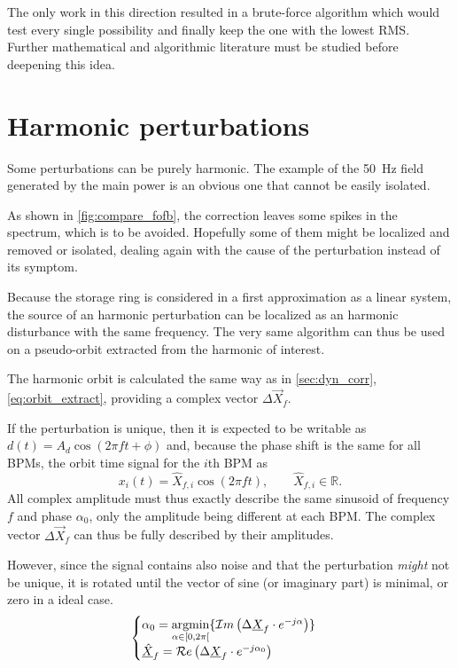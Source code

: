 The only work in this direction resulted in a brute-force algorithm which would test every single possibility and finally keep the one with the lowest RMS. Further mathematical and algorithmic literature must be studied before deepening this idea.

\section{Harmonic perturbations}
\label{sec:loc_dyn}
Some perturbations can be purely harmonic. The example of the \SI{50}{\hertz} field generated by the main power is an obvious one that cannot be easily isolated. 

As shown in \cref{fig:compare_fofb}, the correction leaves some spikes in the spectrum, which is to be avoided. Hopefully some of them might be localized and removed or isolated, dealing again with the cause of the perturbation instead of its symptom.

Because the storage ring is considered in a first approximation as a linear system, the source of an harmonic perturbation can be localized as an harmonic disturbance with the same frequency. The very same algorithm can thus be used on a pseudo-orbit extracted from the harmonic of interest. 

The harmonic orbit is calculated the same way as in \cref{sec:dyn_corr}, \cref{eq:orbit_extract}, providing a complex vector $\Delta\vec{X}_f$.

If the perturbation is unique, then it is expected to be writable as $d(t) = A_d\cos(2\pi f t + \phi)$ and, because the phase shift is the same for all BPMs, the orbit time signal for the $i$th BPM as 
\begin{equation}
	x_i(t) = \hat{X}_{f,i} \cos (2\pi f t), \qquad \hat{X}_{f,i} \in \mathbb{R}.
\end{equation}
All complex amplitude must thus exactly describe the same sinusoid of frequency $f$ and phase $\alpha_0$, only the amplitude being different at each BPM.
The complex vector $\Delta\vec{X}_f$ can thus be fully described by their amplitudes.

However, since the signal contains also noise and that the perturbation \emph{might} not be unique, it is rotated until the vector of sine (or imaginary part) is minimal, or zero in a ideal case.
\begin{equation}
\begin{cases}\alpha_0 = \underset{\alpha \in [0, 2\pi[}{\textrm{argmin}}\{\mathcal{I}m\left(\Delta\underline{X}_f \cdot e^{-j\alpha}\right) \} \label{eq:harm_perturb_opt}\\
\underline{\hat{X}}_f = \mathcal{R}e\left(\Delta\underline{X}_f \cdot e^{-j\alpha_0}\right)
\end{cases}
\end{equation}

